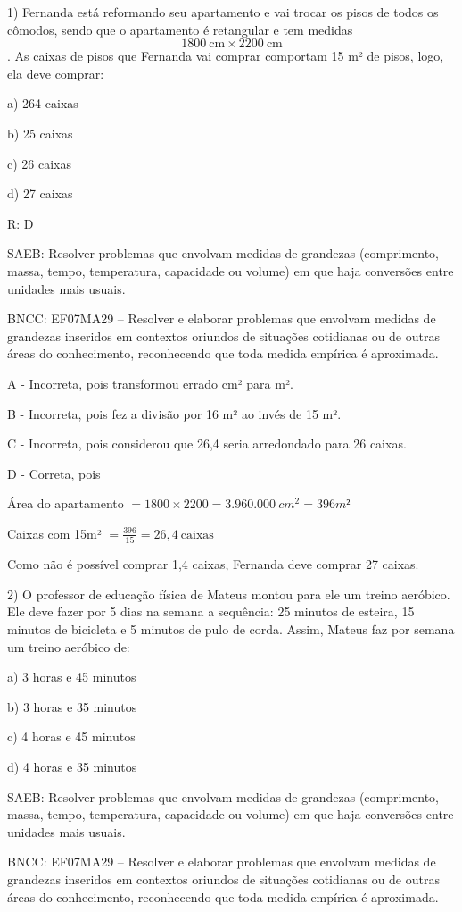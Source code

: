 
1) Fernanda está reformando seu apartamento e vai trocar os pisos de
todos os cômodos, sendo que o apartamento é retangular e tem medidas
\[1800\ \text{cm} \times 2200\ \text{cm}\]. As caixas de pisos que
Fernanda vai comprar comportam 15 m² de pisos, logo, ela deve comprar:

a) 264 caixas

b) 25 caixas

c) 26 caixas

d) 27 caixas

R: D

SAEB: Resolver problemas que envolvam medidas de grandezas (comprimento,
massa, tempo, temperatura, capacidade ou volume) em que haja conversões
entre unidades mais usuais.

BNCC: EF07MA29 -- Resolver e elaborar problemas que envolvam medidas de
grandezas inseridos em contextos oriundos de situações cotidianas ou de
outras áreas do conhecimento, reconhecendo que toda medida empírica é
aproximada.

A - Incorreta, pois transformou errado cm² para m².

B - Incorreta, pois fez a divisão por 16 m² ao invés de 15 m².

C - Incorreta, pois considerou que 26,4 seria arredondado para 26
caixas.

D - Correta, pois

Área do apartamento \(= 1800 \times 2200 = 3.960.000\ cm^{2} = 396m²\)

Caixas com 15m² \(= \frac{396}{15} = 26,4\ \text{caixas}\)

Como não é possível comprar 1,4 caixas, Fernanda deve comprar 27 caixas.

2) O professor de educação física de Mateus montou para ele um treino
aeróbico. Ele deve fazer por 5 dias na semana a sequência: 25 minutos de
esteira, 15 minutos de bicicleta e 5 minutos de pulo de corda. Assim,
Mateus faz por semana um treino aeróbico de:

a) 3 horas e 45 minutos

b) 3 horas e 35 minutos

c) 4 horas e 45 minutos

d) 4 horas e 35 minutos

SAEB: Resolver problemas que envolvam medidas de grandezas (comprimento,
massa, tempo, temperatura, capacidade ou volume) em que haja conversões
entre unidades mais usuais.

BNCC: EF07MA29 -- Resolver e elaborar problemas que envolvam medidas de
grandezas inseridos em contextos oriundos de situações cotidianas ou de
outras áreas do conhecimento, reconhecendo que toda medida empírica é
aproximada.

